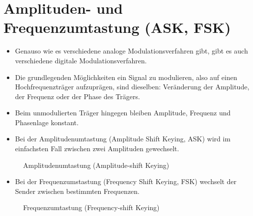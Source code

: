 
\section{Amplituden- und Frequenzumtastung (ASK, FSK)}
\label{section:ask_fsk_afsk}
\begin{frame}%
\begin{itemize}
  \item Genauso wie es verschiedene analoge Modulationsverfahren gibt, gibt es auch verschiedene digitale Modulationsverfahren.
  \item Die grundlegenden Möglichkeiten ein Signal zu modulieren, also auf einen Hochfrequenzträger aufzuprägen, sind dieselben: Veränderung der Amplitude, der Frequenz oder der Phase des Trägers.
  \item Beim unmodulierten Träger hingegen bleiben Amplitude, Frequenz und Phasenlage konstant.
  \end{itemize}
\end{frame}

\begin{frame}\begin{itemize}
  \item Bei der Amplitudenumtastung (Amplitude Shift Keying, ASK) wird im einfachsten Fall zwischen zwei Amplituden gewechselt.
  \end{itemize}
    \pause
    
\begin{figure}
    \caption{\scriptsize Amplitudenumtastung (Amplitude-shift Keying)}
    \label{ask}
\end{figure}



\end{frame}

\begin{frame}\begin{itemize}
  \item Bei der Frequenzumstastung (Frequency Shift Keying, FSK) wechselt der Sender zwischen bestimmten Frequenzen.
  \end{itemize}
    \pause
    
\begin{figure}
    \caption{\scriptsize Frequenzumtastung (Frequency-shift Keying)}
    \label{fsk}
\end{figure}



\end{frame}


